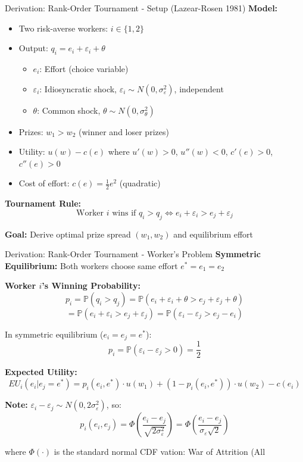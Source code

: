 \documentclass[xcolor={x11names}]{beamer}
\begin{document}
\begin{frame}{Derivation: Rank-Order Tournament - Setup (Lazear-Rosen 1981)}
\textbf{Model:}
\begin{itemize}
  \item Two risk-averse workers: $i \in \{1, 2\}$
  \item Output: $q_i = e_i + \varepsilon_i + \theta$
  \begin{itemize}
    \item $e_i$: Effort (choice variable)
    \item $\varepsilon_i$: Idiosyncratic shock, $\varepsilon_i \sim N(0, \sigma_\varepsilon^2)$, independent
    \item $\theta$: Common shock, $\theta \sim N(0, \sigma_\theta^2)$
  \end{itemize}
  \item Prizes: $w_1 > w_2$ (winner and loser prizes)
  \item Utility: $u(w) - c(e)$ where $u'(w) > 0$, $u''(w) < 0$, $c'(e) > 0$, $c''(e) > 0$
  \item Cost of effort: $c(e) = \frac{1}{2}e^2$ (quadratic)
\end{itemize}

\textbf{Tournament Rule:}
$$\text{Worker } i \text{ wins if } q_i > q_j \Leftrightarrow e_i + \varepsilon_i > e_j + \varepsilon_j$$

\textbf{Goal:} Derive optimal prize spread $(w_1, w_2)$ and equilibrium effort
\end{frame}

\begin{frame}{Derivation: Rank-Order Tournament - Worker's Problem}
\textbf{Symmetric Equilibrium:} Both workers choose same effort $e^* = e_1 = e_2$

\textbf{Worker $i$'s Winning Probability:}
$$p_i = \mathbb{P}(q_i > q_j) = \mathbb{P}(e_i + \varepsilon_i + \theta > e_j + \varepsilon_j + \theta)$$
$$= \mathbb{P}(e_i + \varepsilon_i > e_j + \varepsilon_j) = \mathbb{P}(\varepsilon_i - \varepsilon_j > e_j - e_i)$$

In symmetric equilibrium ($e_i = e_j = e^*$):
$$p_i = \mathbb{P}(\varepsilon_i - \varepsilon_j > 0) = \frac{1}{2}$$

\textbf{Expected Utility:}
$$EU_i(e_i | e_j = e^*) = p_i(e_i, e^*) \cdot u(w_1) + (1-p_i(e_i, e^*)) \cdot u(w_2) - c(e_i)$$

\textbf{Note:} $\varepsilon_i - \varepsilon_j \sim N(0, 2\sigma_\varepsilon^2)$, so:
$$p_i(e_i, e_j) = \Phi\left(\frac{e_i - e_j}{\sqrt{2\sigma_\varepsilon^2}}\right) = \Phi\left(\frac{e_i - e_j}{\sigma_\varepsilon\sqrt{2}}\right)$$

where $\Phi(\cdot)$ is the standard normal CDF
vation: War of Attrition (All\end{frame}
\end{document}
